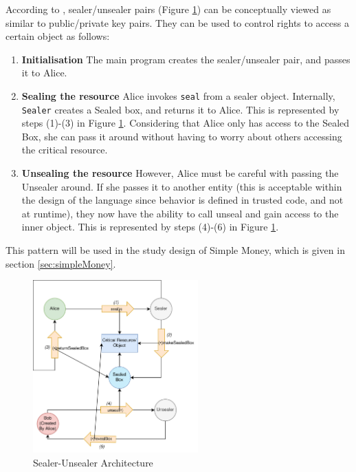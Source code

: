 \noindent
According to \cite{millerFinancial}, sealer/unsealer pairs (Figure \ref{fig:sealerUnsealerDef}) can be conceptually viewed as similar to public/private key pairs. They can be used to control rights to access a certain object as follows:
\begin{enumerate}
    \item \textbf{Initialisation} The main program creates the sealer/unsealer pair, and passes it to Alice.
    \item \textbf{Sealing the resource} Alice invokes \texttt{seal} from a sealer object. Internally, \texttt{Sealer} creates a Sealed box, and returns it to Alice. This is represented by steps (1)-(3) in Figure \ref{fig:sealerUnsealerDef}. Considering that Alice only has access to the Sealed Box, she can pass it around without having to worry about others accessing the critical resource.
    \item \textbf{Unsealing the resource} However, Alice must be careful with passing the Unsealer around. If she passes it to another entity (this is acceptable within the design of the language since behavior is defined in trusted code, and not at runtime), they now have the ability to call unseal and gain access to the inner object. This is represented by steps (4)-(6) in Figure \ref{fig:sealerUnsealerDef}. 
\end{enumerate}

This  pattern will be used in the study design of Simple Money, which is given in section \ref{sec:simpleMoney}.

\begin{figure}[htbp]
\centering
\includegraphics[width=2.5in]{figures/sealerUnsealer_def.jpg}
\caption{Sealer-Unsealer Architecture}
\label{fig:sealerUnsealerDef}
\end{figure}
